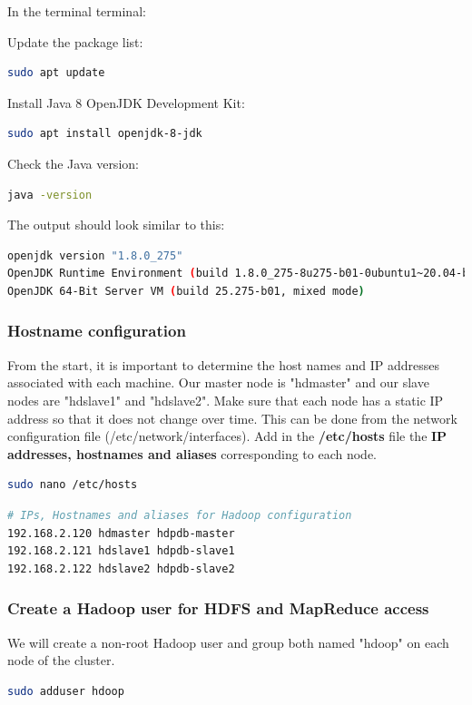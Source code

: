 \documentclass[12pt,english]{book}
\begin{document}
In the terminal terminal:

{\parindent 0pt Update the package list:}
\begin{lstlisting}[language=bash, frame=single]
sudo apt update
\end{lstlisting}
Install Java 8 OpenJDK Development Kit:
\begin{lstlisting}[language=bash, frame=single]
sudo apt install openjdk-8-jdk
\end{lstlisting}
Check the Java version:
\begin{lstlisting}[language=bash, frame=single]
java -version
\end{lstlisting}
The output should look similar to this: 
\begin{lstlisting}[language=bash, frame=single]
openjdk version "1.8.0_275"
OpenJDK Runtime Environment (build 1.8.0_275-8u275-b01-0ubuntu1~20.04-b01)
OpenJDK 64-Bit Server VM (build 25.275-b01, mixed mode)
\end{lstlisting}


\subsubsection{Hostname configuration}


From the start, it is important to determine the host names and IP addresses associated with each machine.
Our master node is "hdmaster" and our slave nodes are "hdslave1" and "hdslave2".
Make sure that each node has a static IP address so that it does not change over time.
This can be done from the network configuration file (/etc/network/interfaces).
Add in the \textbf{/etc/hosts} file the \textbf{IP addresses, hostnames and aliases} corresponding to each node.
\begin{lstlisting}[language=bash, frame=single]
sudo nano /etc/hosts
\end{lstlisting}
\begin{lstlisting}[language=bash, frame=single]
# IPs, Hostnames and aliases for Hadoop configuration
192.168.2.120 hdmaster hdpdb-master
192.168.2.121 hdslave1 hdpdb-slave1
192.168.2.122 hdslave2 hdpdb-slave2
\end{lstlisting}


\subsubsection{Create a Hadoop user for HDFS and MapReduce access}


We will create a non-root Hadoop user and group both named "hdoop" on each node of the cluster.
\begin{lstlisting}[language=bash, frame=single]
sudo adduser hdoop
\end{lstlisting}
\end{document}

